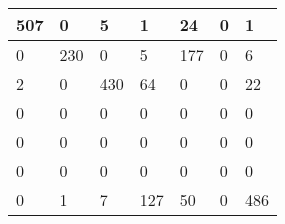 \begin{tabular}{lllllll}
\hline
  507 & 0 & 5 & 1 & 24 & 0 & 1 \\
\hline
  0 & 230 & 0 & 5 & 177 & 0 & 6 \\
\hline
  2 & 0 & 430 & 64 & 0 & 0 & 22 \\
\hline
  0 & 0 & 0 & 0 & 0 & 0 & 0 \\
\hline
  0 & 0 & 0 & 0 & 0 & 0 & 0 \\
\hline
  0 & 0 & 0 & 0 & 0 & 0 & 0 \\
\hline
  0 & 1 & 7 & 127 & 50 & 0 & 486 \\
\hline
\end{tabular}
